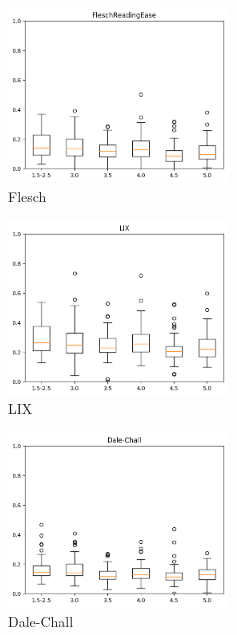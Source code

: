 \documentclass[12pt,journal,compsoc]{IEEEtran}
\begin{document}
\begin{minipage}{\linewidth}
  \centering
  \begin{minipage}{0.25\linewidth}
      \begin{figure}[H]
          \includegraphics[width=2.3in]{../unigrams/scripts/boxplots/FleschReadingEase.png}
          \caption{Flesch}
      \end{figure}
  \end{minipage}
  \hspace{0.05\linewidth}
  \begin{minipage}{0.25\linewidth}
      \begin{figure}[H]
          \includegraphics[width=2.3in]{../unigrams/scripts/boxplots/LIX.png}
          \caption{LIX}
      \end{figure}
  \end{minipage}
  \hspace{0.05\linewidth}
  \begin{minipage}{0.25\linewidth}
      \begin{figure}[H]
          \includegraphics[width=2.3in]{../unigrams/scripts/boxplots/Dale-Chall.png}
          \caption{Dale-Chall}
      \end{figure}
  \end{minipage}
\end{minipage}
\end{document}
